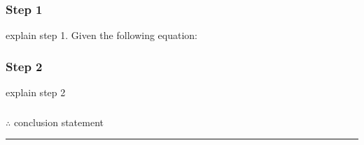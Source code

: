 \subsubsection*{Step 1}
\parbox{\textwidth}{

explain step 1.
Given the following equation:\\

}

\subsubsection*{Step 2}
\parbox{\textwidth}{

explain step 2\\

}

\subsubsection*{\normalfont}{$\therefore$ conclusion statement}

\noindent\rule{\textwidth}{0.4pt}\\


